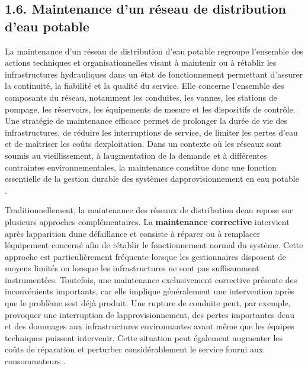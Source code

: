 \documentclass[12pt,a4paper,oneside]{report}
\begin{document}
\subsection{1.6. Maintenance d'un réseau de distribution d'eau
potable}\label{maintenance-dun-ruxe9seau-de-distribution-deau-potable}

La maintenance d'un réseau de distribution d'eau potable regroupe
l'ensemble des actions techniques et organisationnelles visant à
maintenir ou à rétablir les infrastructures hydrauliques dans un état de
fonctionnement permettant d'assurer la continuité, la fiabilité et la
qualité du service. Elle concerne l'ensemble des composants du réseau,
notamment les conduites, les vannes, les stations de pompage, les
réservoirs, les équipements de mesure et les dispositifs de contrôle.
Une stratégie de maintenance efficace permet de prolonger la durée de
vie des infrastructures, de réduire les interruptions de service, de
limiter les pertes d'eau et de maîtriser les coûts
d\textquotesingle exploitation. Dans un contexte où les réseaux sont
soumis au vieillissement, à l\textquotesingle augmentation de la demande
et à différentes contraintes environnementales, la maintenance constitue
donc une fonction essentielle de la gestion durable des systèmes
d\textquotesingle approvisionnement en eau potable \cite{ref42}.

Traditionnellement, la maintenance des réseaux de distribution
d\textquotesingle eau repose sur plusieurs approches complémentaires. La
\textbf{maintenance corrective} intervient après
l\textquotesingle apparition d\textquotesingle une défaillance et
consiste à réparer ou à remplacer l\textquotesingle équipement concerné
afin de rétablir le fonctionnement normal du système. Cette approche est
particulièrement fréquente lorsque les gestionnaires disposent de moyens
limités ou lorsque les infrastructures ne sont pas suffisamment
instrumentées. Toutefois, une maintenance exclusivement corrective
présente des inconvénients importants, car elle implique généralement
une intervention après que le problème s\textquotesingle est déjà
produit. Une rupture de conduite peut, par exemple, provoquer une
interruption de l\textquotesingle approvisionnement, des pertes
importantes d\textquotesingle eau et des dommages aux infrastructures
environnantes avant même que les équipes techniques puissent intervenir.
Cette situation peut également augmenter les coûts de réparation et
perturber considérablement le service fourni aux consommateurs \cite{ref45}.
\end{document}
